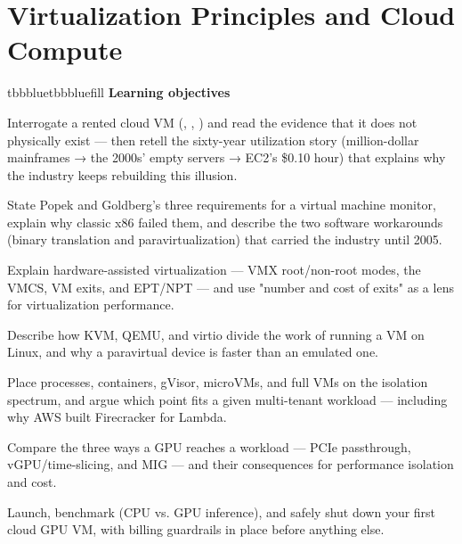\setcounter{chapter}{1}
\chapter{Virtualization Principles and Cloud Compute}

\begin{calloutbox}{tbbblue}{tbbbluefill}
{\normalsize\bfseries\color{tbbblue}Learning objectives}\par\vspace{3pt}
\begin{tbbitemize}
  \item Interrogate a rented cloud VM (, , ) and read the evidence that it does not physically exist — then retell the sixty-year utilization story (million-dollar mainframes → the 2000s' empty servers → EC2's \$0.10 hour) that explains why the industry keeps rebuilding this illusion.
  \item State Popek and Goldberg's three requirements for a virtual machine monitor, explain why classic x86 failed them, and describe the two software workarounds (binary translation and paravirtualization) that carried the industry until 2005.
  \item Explain hardware-assisted virtualization — VMX root/non-root modes, the VMCS, VM exits, and EPT/NPT — and use "number and cost of exits" as a lens for virtualization performance.
  \item Describe how KVM, QEMU, and virtio divide the work of running a VM on Linux, and why a paravirtual device is faster than an emulated one.
  \item Place processes, containers, gVisor, microVMs, and full VMs on the isolation spectrum, and argue which point fits a given multi-tenant workload — including why AWS built Firecracker for Lambda.
  \item Compare the three ways a GPU reaches a workload — PCIe passthrough, vGPU/time-slicing, and MIG — and their consequences for performance isolation and cost.
  \item Launch, benchmark (CPU vs. GPU inference), and safely shut down your first cloud GPU VM, with billing guardrails in place before anything else.
\end{tbbitemize}
\end{calloutbox}

